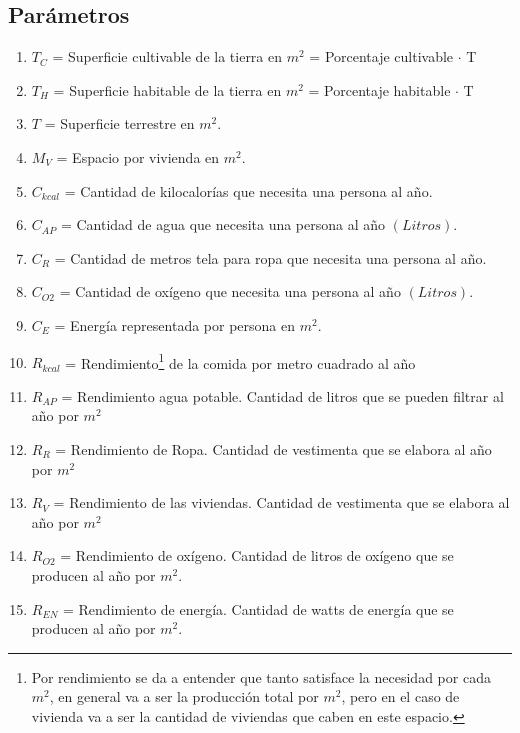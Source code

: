 \documentclass[12pt]{report}
\begin{document}

\subsection*{Par\'ametros}


\begin{enumerate}
    \item $T_{C}$ = Superficie cultivable de la tierra en $m^{2}$ = Porcentaje cultivable $\cdot$ T
    \item $T_{H}$ = Superficie habitable de la tierra en $m^{2}$ = Porcentaje habitable $\cdot$ T
    \item $T$ = Superficie terrestre en $m^{2}$. 
    \item $M_{V}$ = Espacio por vivienda en $m^{2}$. 
    \item $C_{kcal}$ = Cantidad de kilocalor\'ias que necesita una persona al a\~no. 
    \item $C_{AP}$ = Cantidad de agua que necesita una persona al a\~no $(Litros)$.
    \item $C_{R}$ = Cantidad de metros tela para ropa que necesita una persona al a\~no. 
    \item $C_{O2}$ = Cantidad de ox\'igeno que necesita una persona al a\~no $(Litros)$. 
    \item $C_{E}$ = Energ\'ia representada por persona en $m^{2}$. 
    \item $R_{kcal}$ = Rendimiento\footnote{Por rendimiento se da a entender que tanto satisface la necesidad por cada $m^{2}$, en general va a ser la producci\'on total por $m^{2}$, pero en el caso de vivienda va a ser la cantidad de viviendas que caben en este espacio.} de la comida por metro cuadrado al a\~no 
    \item $R_{AP}$ = Rendimiento agua potable. Cantidad de litros que se pueden filtrar al a\~no por $m^{2}$
    \item $R_{R}$ = Rendimiento de Ropa. Cantidad de vestimenta que se elabora al a\~no por $m^{2}$
    \item $R_{V}$ = Rendimiento de las viviendas. Cantidad de vestimenta que se elabora al a\~no por $m^{2}$
    \item $R_{O2}$ = Rendimiento de ox\'igeno. Cantidad de litros de ox\'igeno que se producen al a\~no por $m^{2}$.
    \item $R_{EN}$ = Rendimiento de energ\'ia. Cantidad de watts de energ\'ia que se producen al a\~no por $m^{2}$.
\end{enumerate}
\end{document}
